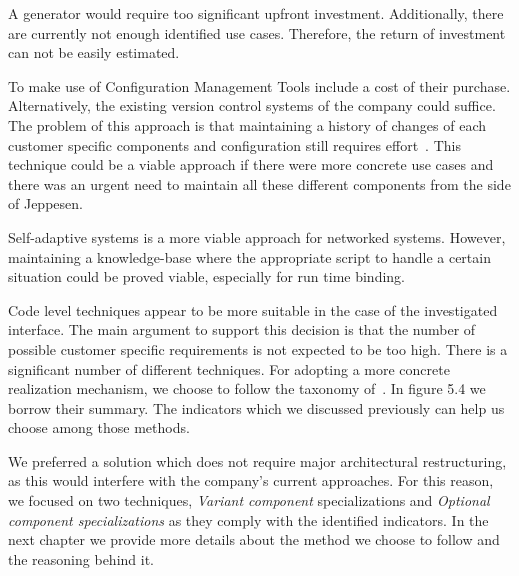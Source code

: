 A generator would require too significant upfront investment. Additionally, there are currently not enough identified use cases. Therefore, the return of investment can not be easily estimated. 

To make use of Configuration Management Tools include a cost of their purchase. Alternatively, the existing version control systems of the company could suffice. The problem of this approach is that maintaining a history of changes of each customer specific components and configuration still requires effort~\cite{Bachmann2001}.  %
This technique could be a viable approach if there were more concrete use cases and there was an urgent need to maintain all these different components from the side of Jeppesen.

Self-adaptive systems is a more viable approach for networked systems. However, maintaining a knowledge-base where the appropriate script to handle a certain situation could be proved viable, especially for run time binding.

Code level techniques appear to be more suitable in the case of the investigated interface. The main argument to support this decision is that the number of possible customer specific requirements is not expected to be too high. There is a significant number of different techniques. %
For adopting a more concrete realization mechanism, we choose to follow the taxonomy of~\cite{JillesVanGurp2001}. %
In figure 5.4 we borrow their summary. The indicators which we discussed previously can help us choose among those methods. 



%

We preferred a solution which does not require major architectural restructuring, as this would interfere with the company's current approaches. For this reason, we focused on two techniques, \textit{Variant component} specializations and \textit{Optional component specializations} as they comply with the identified indicators. 
In the next chapter we provide more details about the method we choose to follow and the reasoning behind it. 
